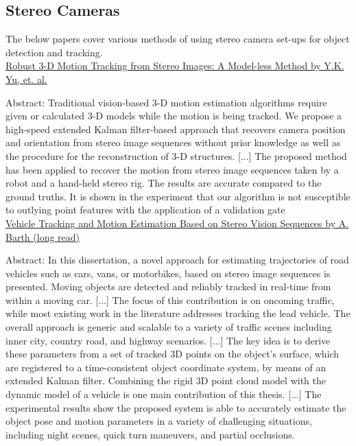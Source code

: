 \documentclass[11pt, a4paper]{article}
\begin{document}
\subsection{Stereo Cameras}%
\label{sub:stereo_cameras}

The below papers cover various methods of using stereo camera set-ups for object detection and tracking. \\


\href{http://www.cse.cuhk.edu.hk/~khwong/J2008_IEEE_TIM_Stereo%20Kalman%20.pdf}{Robust 3-D Motion Tracking from Stereo Images: A Model-less Method by Y.K. Yu, et. al.}

Abstract: Traditional vision-based 3-D motion estimation algorithms require given or calculated 3-D models while the motion is being tracked. We propose a high-speed extended Kalman filter-based approach that recovers camera position and orientation from stereo image sequences without prior knowledge as well as the procedure for the reconstruction of 3-D structures. [...] The proposed method has been applied to recover the motion from stereo image sequences taken by a robot and a hand-held stereo rig. The results are accurate compared to the ground truths. It is shown in the experiment that our algorithm is not susceptible to outlying point features with the application of a validation gate \\



\href{http://hss.ulb.uni-bonn.de/2010/2356/2356.pdf}{Vehicle Tracking and Motion Estimation Based on Stereo Vision Sequences by A. Barth (long read)}

Abstract: In this dissertation, a novel approach for estimating trajectories of road vehicles such as cars, vans, or motorbikes, based on stereo image sequences is presented. Moving objects are detected and reliably tracked in real-time from within a moving car. [...] The focus of this contribution is on oncoming traffic, while most existing work in the literature addresses tracking the lead vehicle. The overall approach is generic and scalable to a variety of traffic scenes including inner city, country road, and highway scenarios. [...] The key idea is to derive these parameters from a set of tracked 3D points on the object’s surface, which are registered to a time-consistent object coordinate system, by means of an extended Kalman filter. Combining the rigid 3D point cloud model with the dynamic model of a vehicle is one main contribution of this thesis. [...] The experimental results show the proposed system is able to accurately estimate the object pose and motion parameters in a variety of challenging situations, including night scenes, quick turn maneuvers, and partial occlusions.\\
\end{document}
